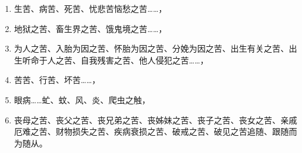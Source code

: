 \begin{enumerate}
    \item 生苦、病苦、死苦、忧悲苦恼愁之苦……，
    \item 地狱之苦、畜生界之苦、饿鬼境之苦……，
    \item 为人之苦、入胎为因之苦、怀胎为因之苦、分娩为因之苦、出生有关之苦、出生听命于人之苦、自我残害之苦、他人侵犯之苦……，
    \item 苦苦、行苦、坏苦……，
    \item 眼病……虻、蚊、风、炎、爬虫之触，
    \item 丧母之苦、丧父之苦、丧兄弟之苦、丧姊妹之苦、丧子之苦、丧女之苦、亲戚厄难之苦、财物损失之苦、疾病衰损之苦、破戒之苦、破见之苦追随、跟随而为随从。
\end{enumerate}



